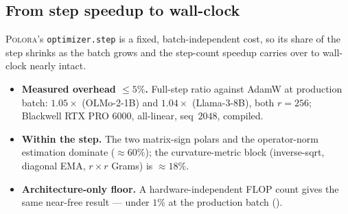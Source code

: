 \documentclass[11pt]{article}
\newcommand{\methodname}{\textsc{Polora}\xspace}
\theoremstyle{plain}
\theoremstyle{definition}
\theoremstyle{remark}
\begin{document}
\subsection{From step speedup to wall-clock}
\label{sec:exp-walltime}
\methodname{}'s \texttt{optimizer.step} is a fixed, batch-independent cost, so its share
of the step shrinks as the batch grows and the step-count speedup carries over to
wall-clock nearly intact.
\begin{itemize}[leftmargin=1.5em,itemsep=1pt,topsep=2pt]
  \item \textbf{Measured overhead ${\le}5\%$.} Full-step ratio against AdamW at production batch: $1.05\times$ (OLMo-2-1B) and $1.04\times$ (Llama-3-8B), both $r{=}256$; Blackwell RTX PRO 6000, all-linear, seq~$2048$, compiled.
  \item \textbf{Within the step.} The two matrix-sign polars and the operator-norm estimation dominate (${\approx}60\%$); the curvature-metric block (inverse-sqrt, diagonal EMA, $r{\times}r$ Grams) is ${\approx}18\%$.
  \item \textbf{Architecture-only floor.} A hardware-independent FLOP count gives the same near-free result --- under $1\%$ at the production batch ().
\end{itemize}
\end{document}
